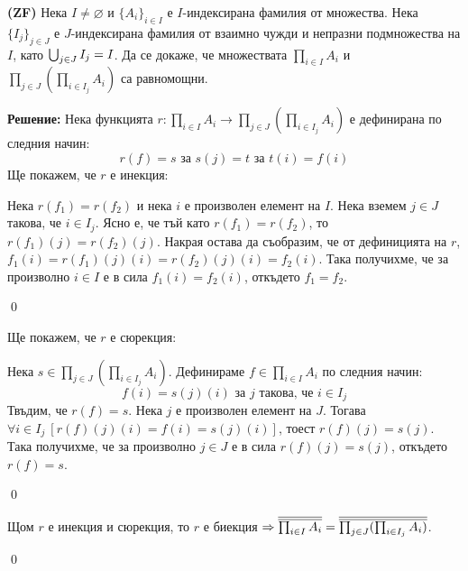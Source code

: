 \begin{problem}
\textbf{(ZF)}
Нека $I \ne \varnothing$ и $\{A_i\}_{i \in I}$ е $I$-индексирана фамилия от множества.
Нека $\{I_j\}_{j \in J}$ е $J$-индексирана фамилия от взаимно чужди и непразни подмножества на $I$,
като $\bigcup_{j \in J} I_j = I$.
Да се докаже, че множествата
$\prod_{i \in I} A_i$ и $\prod_{j \in J}(\prod_{i \in I_j} A_i)$ са равномощни.
\end{problem}

\textbf{Решение:}
\smallbreak
\quad
Нека функцията $r: \prod_{i \in I} A_i \to \prod_{j \in J}(\prod_{i \in I_j} A_i)$ е дефинирана по следния начин:
\[
r(f) = s \text{ за }
s(j) = t \text{ за }
t(i) = f(i)
\]
\quad
Ще покажем, че $r$ е инекция:

\begin{tcolorbox}[mybox={Доказателство:}]
\quad
Нека $r(f_1) = r(f_2)$ и нека $i$ е произволен елемент на $I$.
Нека вземем $j \in J$ такова, че $i \in I_j$.
Ясно е, че тъй като $r(f_1) = r(f_2)$, то $r(f_1)(j) = r(f_2)(j)$.
Накрая остава да съобразим, че от дефиницията на $r$,
$f_1(i) = r(f_1)(j)(i) = r(f_2)(j)(i) = f_2(i)$.
Така получихме, че за произволно $i \in I$ е в сила $f_1(i) = f_2(i)$, откъдето
$f_1 = f_2$.

\qed
\end{tcolorbox}

\quad
Ще покажем, че $r$ е сюрекция:

\begin{tcolorbox}[mybox={Доказателство:}]
\quad
Нека $s \in \prod_{j \in J}(\prod_{i \in I_j} A_i)$.
Дефинираме $f \in \prod_{i \in I} A_i$ по следния начин:
\[
f(i) = s(j)(i) \text{ за $j$ такова, че } i \in I_j
\]
\quad
Твъдим, че $r(f) = s$. Нека $j$ е произволен елемент на $J$.
Тогава $\forall i \in I_j\ [r(f)(j)(i) = f(i) = s(j)(i)]$, тоест $r(f)(j) = s(j)$.
Така получихме, че за произволно $j \in J$ е в сила
$r(f)(j) = s(j)$, откъдето $r(f) = s$.

\qed
\end{tcolorbox}


\quad
Щом $r$ е инекция и сюрекция, то $r$ е биекция
$\Rightarrow \overline{\overline{\prod_{i \in I} A_i}} = \overline{\overline{\prod_{j \in J}(\prod_{i \in I_j} A_i)}}$.

\qed
